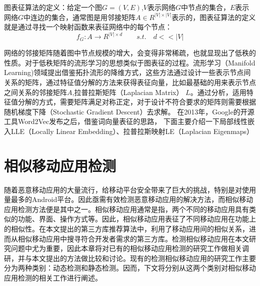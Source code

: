 图表征算法的定义：给定一个图$G = (V,E)$,$V$表示网络$G$中节点的集合，$E$表示网络$G$中连边的集合，通常图是用邻接矩阵$A \in R^{|V|\times|V|}$表示的，图表征算法的定义就是通过寻找一个映射函数来表征网络中的每个节点：
\begin{equation}
f_G: A \rightarrow R^{|V| \times d} \qquad s.t.\quad d<<|V|
\end{equation}

网络的邻接矩阵随着图中节点规模的增大，会变得非常稀疏，也就显现出了低秩的性质。对于低秩矩阵的流形学习的思想类似于图表征的过程。流形学习（Manifold Learning)领域提出借鉴拓扑流形的降维方式，这些方法通过设计一些表示节点间关系的矩阵，通过特征值分解的方法来获得表征向量，比如最基础的用来表示节点之间关系的邻接矩阵$A$,拉普拉斯矩阵（Laplacian Matrix） $L$。通过分析，适用特征值分解的方式，需要矩阵满足对称正定，对于设计不符合要求的矩阵则需要根据随机梯度下降（Stochastic Gradient Descent）去求解。
在2013年，Google的开源工具Word2Vec\cite{mikolov2013efficient}发布之后，借鉴词向量表征的思路，
下面主要介绍一下局部线性嵌入LLE（Locally Linear Embedding）、拉普拉斯映射LE（Laplacian Eigenmaps）




\section{相似移动应用检测}
随着恶意移动应用的大量流行，给移动平台安全带来了巨大的挑战，特别是对使用量最多的Android平台\cite{huang2014asdroid}。因此亟需有效检测恶意移动应用的解决方法，而相似移动应用检测方法便是其中之一。相似移动应用通常是指，两个不同的移动应用具有类似的功能、界面、操作方式等。因此，相似移动应用表征了不同移动应用在功能上的相似性。在本文提出的第三方库推荐算法中，利用了移动应用间的相似关系，进而从相似移动应用中搜寻符合开发者需求的第三方库。检测相似移动应用在本文研究问题中尤为重要，因此本章将对已有的相似移动应用检测的研究工作做相关调研，并与本文提出的方法做比较和讨论。现有的检测相似移动应用的研究工作主要分为两种类别：动态检测和静态检测。因而，下文将分别从这两个类别对相似移动应用检测的相关工作进行阐述。

